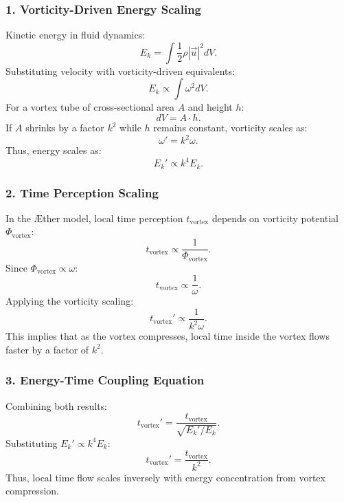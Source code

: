 \documentclass[a4paper,10pt]{article}
\begin{document}
    \subsubsection*{1. Vorticity-Driven Energy Scaling}
    Kinetic energy in fluid dynamics:
    \begin{equation*}
        E_k = \int \frac{1}{2} \rho |\vec{u}|^2 dV.
    \end{equation*}
    Substituting velocity with vorticity-driven equivalents:
    \begin{equation*}
        E_k \propto \int \omega^2 dV.
    \end{equation*}
    For a vortex tube of cross-sectional area $A$ and height $h$:
    \begin{equation*}
        dV = A \cdot h.
    \end{equation*}
    If $A$ shrinks by a factor $k^2$ while $h$ remains constant, vorticity scales as:
    \begin{equation*}
        \omega' = k^2 \omega.
    \end{equation*}
    Thus, energy scales as:
    \begin{equation*}
        E_k' \propto k^4 E_k.
    \end{equation*}

    \subsubsection*{2. Time Perception Scaling}
    In the Æther model, local time perception $t_\text{vortex}$ depends on vorticity potential $\Phi_\text{vortex}$:
    \begin{equation*}
        t_\text{vortex} \propto \frac{1}{\Phi_\text{vortex}}.
    \end{equation*}
    Since $\Phi_\text{vortex} \propto \omega$:
    \begin{equation*}
        t_\text{vortex} \propto \frac{1}{\omega}.
    \end{equation*}
    Applying the vorticity scaling:
    \begin{equation*}
        t_\text{vortex}' \propto \frac{1}{k^2 \omega}.
    \end{equation*}
    This implies that as the vortex compresses, local time inside the vortex flows faster by a factor of $k^2$.

    \subsubsection*{3. Energy-Time Coupling Equation}
    Combining both results:
    \begin{equation*}
        t_\text{vortex}' = \frac{t_\text{vortex}}{\sqrt{E_k' / E_k}}.
    \end{equation*}
    Substituting $E_k' \propto k^4 E_k$:
    \begin{equation*}
        t_\text{vortex}' = \frac{t_\text{vortex}}{k^2}.
    \end{equation*}
    Thus, local time flow scales inversely with energy concentration from vortex compression.
\end{document}
